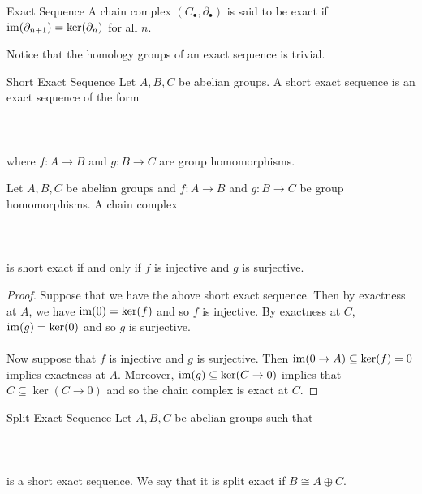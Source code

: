 \documentclass[a4paper]{article}
\begin{document}
\begin{defn}{Exact Sequence}{} A chain complex $(C_\bullet,\partial_\bullet)$ is said to be exact if $\operatorname{im}(\partial_{n+1})=\ker(\partial_n)$ for all $n$. 
\end{defn}

Notice that the homology groups of an exact sequence is trivial. 

\begin{defn}{Short Exact Sequence}{} Let $A,B,C$ be abelian groups. A short exact sequence is an exact sequence of the form \\~\\
\\~\\
where $f:A\to B$ and $g:B\to C$ are group homomorphisms. 
\end{defn}

\begin{prp}{}{} Let $A,B,C$ be abelian groups and $f:A\to B$ and $g:B\to C$ be group homomorphisms. A chain complex \\~\\
\\~\\
is short exact if and only if $f$ is injective and $g$ is surjective. \tcbline
\begin{proof}
Suppose that we have the above short exact sequence. Then by exactness at $A$, we have $\operatorname{im}(0)=\ker(f)$ and so $f$ is injective. By exactness at $C$, $\operatorname{im}(g)=\ker(0)$ and so $g$ is surjective. \\~\\

Now suppose that $f$ is injective and $g$ is surjective. Then $\operatorname{im}(0\to A)\subseteq\ker(f)=0$ implies exactness at $A$. Moreover, $\operatorname{im}(g)\subseteq\ker(C\to 0)$ implies that $C\subseteq\ker(C\to 0)$ and so the chain complex is exact at $C$. 
\end{proof}
\end{prp}

\begin{defn}{Split Exact Sequence}{} Let $A,B,C$ be abelian groups such that \\~\\
\\~\\
is a short exact sequence. We say that it is split exact if $B\cong A\oplus C$. 
\end{defn}
\end{document}
